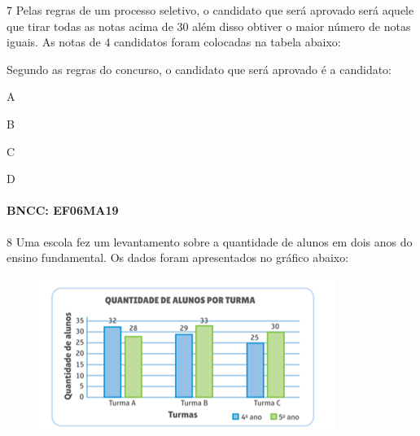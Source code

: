 \num{7}  Pelas regras de um processo seletivo, o candidato que será aprovado
será aquele que tirar todas as notas acima de $30$ além disso obtiver o
maior número de notas iguais. As notas de $4$ candidatos foram colocadas
na tabela abaixo:


Segundo as regras do concurso, o candidato que será aprovado é a
candidato:

\begin{escolha}
\item A
\item B
\item C
\item D
\end{escolha}

\paragraph{BNCC: EF06MA19 }


\num{8} Uma escola fez um levantamento sobre a quantidade de alunos em dois
anos do ensino fundamental. Os dados foram apresentados no gráfico
abaixo:

\begin{figure}
\includegraphics[width=3.78125in,height=1.94792in]{./imgSAEB_6_MAT/media/image110.png}
\end{figure}

